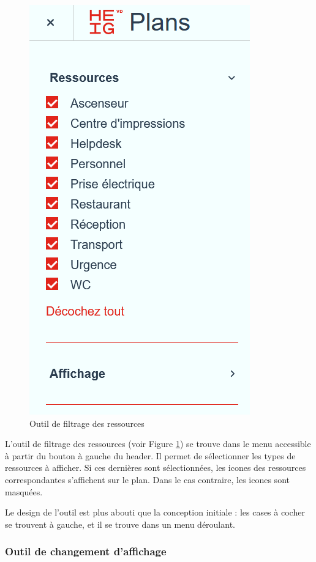 \documentclass[
    iai, %
    il, %
]{heig-tb}
\begin{document}
\begin{figure}[h]
    \centering
    \includegraphics[scale=0.5]{frontend-filtresRessources.png}
    \caption{Outil de filtrage des ressources}
    \label{fig:ressources-filtre}
\end{figure}

L'outil de filtrage des ressources (voir Figure \ref{fig:ressources-filtre}) se trouve dans le menu accessible à partir du bouton à gauche du header.
Il permet de sélectionner les types de ressources à afficher.
Si ces dernières sont sélectionnées, les icones des ressources correspondantes s'affichent sur le plan.
Dans le cas contraire, les icones sont masquées.

Le design de l'outil est plus abouti que la conception initiale : les cases à cocher se trouvent à gauche, et
il se trouve dans un menu déroulant.

\subsubsection{Outil de changement d'affichage}
\end{document}
